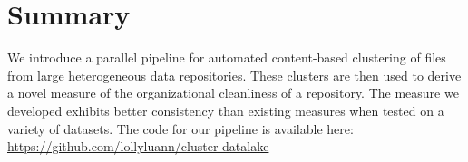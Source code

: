 \documentclass[sigconf,screen]{acmart}
\begin{document}
\section{Summary}
We introduce a parallel pipeline for automated content-based clustering of files from large heterogeneous data repositories. These clusters are then used to derive a novel measure of the organizational cleanliness of a repository. The measure we developed exhibits better consistency than existing measures when tested on a variety of datasets. The code for our pipeline is available here: 
\url{https://github.com/lollyluann/cluster-datalake}

\nocite{*}  %


\end{document}
